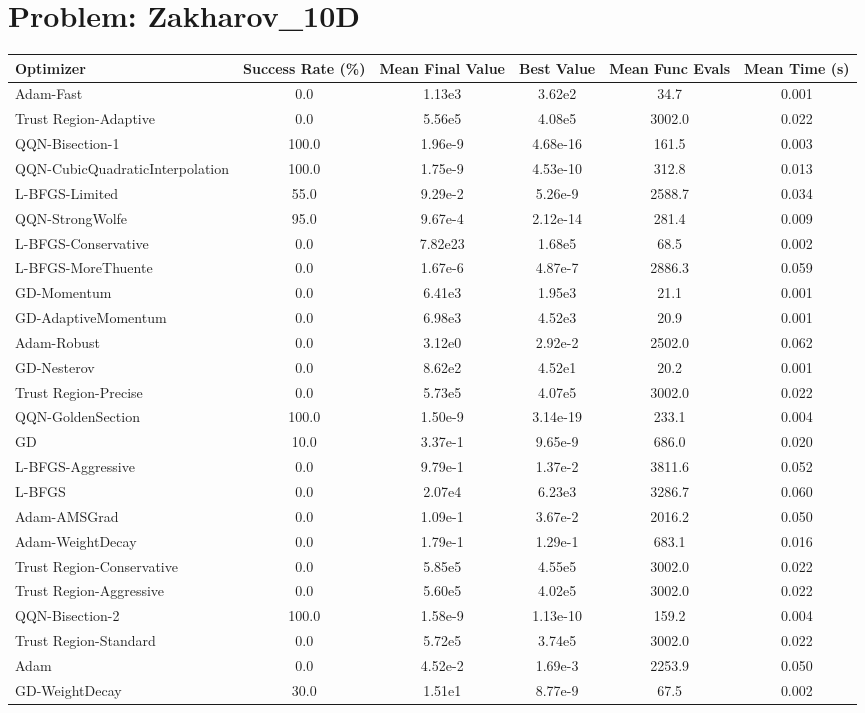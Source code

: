 \documentclass{article}
\begin{document}
\section{Problem: Zakharov\_10D}
\begin{longtable}{p{3cm}*{5}{c}}
\toprule
\textbf{Optimizer} & \textbf{Success Rate (\%)} & \textbf{Mean Final Value} & \textbf{Best Value} & \textbf{Mean Func Evals} & \textbf{Mean Time (s)} \\
\midrule
Adam-Fast & 0.0 & 1.13e3 & 3.62e2 & 34.7 & 0.001 \\
Trust Region-Adaptive & 0.0 & 5.56e5 & 4.08e5 & 3002.0 & 0.022 \\
QQN-Bisection-1 & 100.0 & 1.96e-9 & 4.68e-16 & 161.5 & 0.003 \\
QQN-CubicQuadraticInterpolation & 100.0 & 1.75e-9 & 4.53e-10 & 312.8 & 0.013 \\
L-BFGS-Limited & 55.0 & 9.29e-2 & 5.26e-9 & 2588.7 & 0.034 \\
QQN-StrongWolfe & 95.0 & 9.67e-4 & 2.12e-14 & 281.4 & 0.009 \\
L-BFGS-Conservative & 0.0 & 7.82e23 & 1.68e5 & 68.5 & 0.002 \\
L-BFGS-MoreThuente & 0.0 & 1.67e-6 & 4.87e-7 & 2886.3 & 0.059 \\
GD-Momentum & 0.0 & 6.41e3 & 1.95e3 & 21.1 & 0.001 \\
GD-AdaptiveMomentum & 0.0 & 6.98e3 & 4.52e3 & 20.9 & 0.001 \\
Adam-Robust & 0.0 & 3.12e0 & 2.92e-2 & 2502.0 & 0.062 \\
GD-Nesterov & 0.0 & 8.62e2 & 4.52e1 & 20.2 & 0.001 \\
Trust Region-Precise & 0.0 & 5.73e5 & 4.07e5 & 3002.0 & 0.022 \\
QQN-GoldenSection & 100.0 & 1.50e-9 & 3.14e-19 & 233.1 & 0.004 \\
GD & 10.0 & 3.37e-1 & 9.65e-9 & 686.0 & 0.020 \\
L-BFGS-Aggressive & 0.0 & 9.79e-1 & 1.37e-2 & 3811.6 & 0.052 \\
L-BFGS & 0.0 & 2.07e4 & 6.23e3 & 3286.7 & 0.060 \\
Adam-AMSGrad & 0.0 & 1.09e-1 & 3.67e-2 & 2016.2 & 0.050 \\
Adam-WeightDecay & 0.0 & 1.79e-1 & 1.29e-1 & 683.1 & 0.016 \\
Trust Region-Conservative & 0.0 & 5.85e5 & 4.55e5 & 3002.0 & 0.022 \\
Trust Region-Aggressive & 0.0 & 5.60e5 & 4.02e5 & 3002.0 & 0.022 \\
QQN-Bisection-2 & 100.0 & 1.58e-9 & 1.13e-10 & 159.2 & 0.004 \\
Trust Region-Standard & 0.0 & 5.72e5 & 3.74e5 & 3002.0 & 0.022 \\
Adam & 0.0 & 4.52e-2 & 1.69e-3 & 2253.9 & 0.050 \\
GD-WeightDecay & 30.0 & 1.51e1 & 8.77e-9 & 67.5 & 0.002 \\
\bottomrule
\end{longtable}
\end{document}
